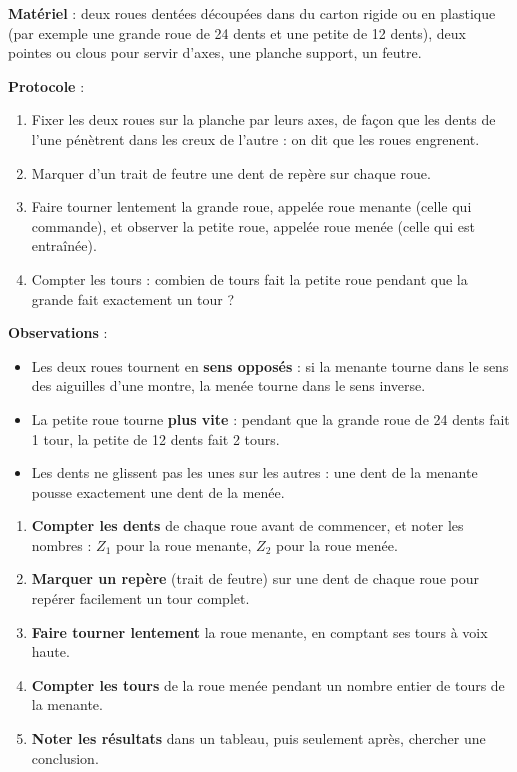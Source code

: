 \documentclass[11pt]{article}
\newcommand{\cle}[1]{{\popxbold\color{popdark}#1}}
\begin{document}
\begin{experience}
\textbf{Matériel} : deux roues dentées découpées dans du carton rigide ou en plastique (par exemple une grande roue de 24 dents et une petite de 12 dents), deux pointes ou clous pour servir d'axes, une planche support, un feutre.

\textbf{Protocole} :
\begin{enumerate}
\item Fixer les deux roues sur la planche par leurs axes, de façon que les dents de l'une pénètrent dans les creux de l'autre : on dit que les roues \cle{engrenent}.
\item Marquer d'un trait de feutre une dent de repère sur chaque roue.
\item Faire tourner lentement la grande roue, appelée roue \cle{menante} (celle qui commande), et observer la petite roue, appelée roue \cle{menée} (celle qui est entraînée).
\item Compter les tours : combien de tours fait la petite roue pendant que la grande fait exactement un tour ?
\end{enumerate}

\textbf{Observations} :
\begin{itemize}
\item Les deux roues tournent en \textbf{sens opposés} : si la menante tourne dans le sens des aiguilles d'une montre, la menée tourne dans le sens inverse.
\item La petite roue tourne \textbf{plus vite} : pendant que la grande roue de 24 dents fait 1 tour, la petite de 12 dents fait 2 tours.
\item Les dents ne glissent pas les unes sur les autres : une dent de la menante pousse exactement une dent de la menée.
\end{itemize}
\end{experience}

\begin{methode}
\begin{enumerate}
\item \textbf{Compter les dents} de chaque roue avant de commencer, et noter les nombres : $Z_1$ pour la roue menante, $Z_2$ pour la roue menée.
\item \textbf{Marquer un repère} (trait de feutre) sur une dent de chaque roue pour repérer facilement un tour complet.
\item \textbf{Faire tourner lentement} la roue menante, en comptant ses tours à voix haute.
\item \textbf{Compter les tours} de la roue menée pendant un nombre entier de tours de la menante.
\item \textbf{Noter les résultats} dans un tableau, puis seulement après, chercher une conclusion.
\end{enumerate}
\end{methode}
\end{document}
